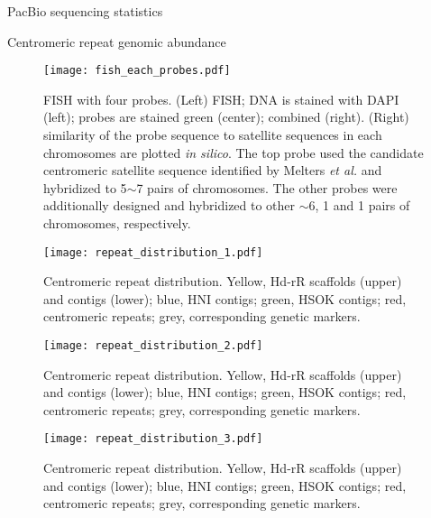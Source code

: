 \begin{table}[htbp]
  \centering
  \caption{PacBio sequencing statistics}
  
  \label{sequencing_stats}
\end{table}

\begin{table}[htbp]
  \centering
  \caption{Centromeric repeat genomic abundance}
  
  \label{centromeric_repeat_genomic_abundance}
\end{table}

\begin{figure}[p]
  \centering
  \texttt{[image: fish\_each\_probes.pdf]}
  \caption{
    FISH with four probes. (Left) FISH; DNA is stained with DAPI (left); probes are stained green (center); combined (right). (Right) similarity of the probe sequence to satellite sequences in each chromosomes are plotted \textit{in silico}. The top probe used the candidate centromeric satellite sequence identified by Melters \textit{et al.} \cite{Melters2013} and hybridized to 5$\sim$7 pairs of chromosomes. The other probes were additionally designed and hybridized to other $\sim$6, 1 and 1 pairs of chromosomes, respectively.
  }
  \label{fish_each}
\end{figure}


\begin{figure}[p]
  \centering
  \texttt{[image: repeat\_distribution\_1.pdf]}
  \caption{
    Centromeric repeat distribution. Yellow, Hd-rR scaffolds (upper) and contigs (lower); blue, HNI contigs; green, HSOK contigs; red, centromeric repeats; grey, corresponding genetic markers.
  }
  \label{fig:repeat_distribution}
\end{figure}

\addtocounter{figure}{-1}
\begin{figure}[p]
  \centering
  \texttt{[image: repeat\_distribution\_2.pdf]}
  \caption{
    Centromeric repeat distribution. Yellow, Hd-rR scaffolds (upper) and contigs (lower); blue, HNI contigs; green, HSOK contigs; red, centromeric repeats; grey, corresponding genetic markers.
  }
  \label{fig:repeat_distribution}
\end{figure}

\addtocounter{figure}{-1}
\begin{figure}[p]
  \centering
  \texttt{[image: repeat\_distribution\_3.pdf]}
  \caption{
    Centromeric repeat distribution. Yellow, Hd-rR scaffolds (upper) and contigs (lower); blue, HNI contigs; green, HSOK contigs; red, centromeric repeats; grey, corresponding genetic markers.
  }
  \label{fig:repeat_distribution}
\end{figure}



